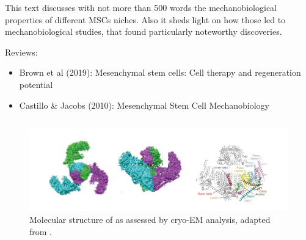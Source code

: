 This text discusses with not more than 500 words the mechanobiological properties of different MSCs niches. Also it sheds light on how those led to mechanobiological studies, that found particularly noteworthy discoveries. \par

Reviews:
\begin{itemize}
	\item Brown et al (2019): Mesenchymal stem cells: Cell therapy and regeneration potential
	\item Castillo \& Jacobs (2010): Mesenchymal Stem Cell Mechanobiology
\end{itemize}


\subsection{\Piezo{}}

\begin{figure}
	\centering
	\includegraphics[width=0.6\linewidth]{PiezoMolecule.png}
	\caption{Molecular structure of \Piezo{} as assessed by cryo-EM analysis, adapted from \cite{Saotome2018, Zhao2018}.}
	\label{pic:Piezo}
\end{figure}

